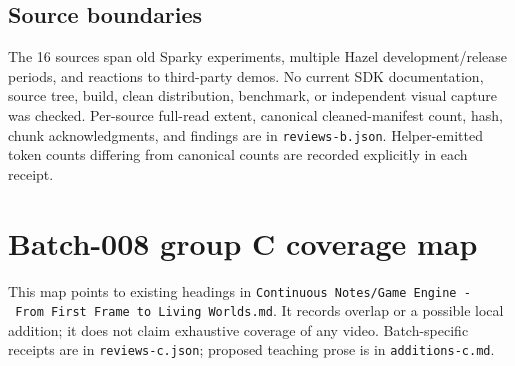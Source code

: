\subsection{Source boundaries}\label{appendix-877738f6f4d2-source-boundaries}

The 16 sources span old Sparky experiments, multiple Hazel development/release periods, and reactions to third-party demos. No current SDK documentation, source tree, build, clean distribution, benchmark, or independent visual capture was checked. Per-source full-read extent, canonical cleaned-manifest count, hash, chunk acknowledgments, and findings are in \texttt{reviews-b.json}. Helper-emitted token counts differing from canonical counts are recorded explicitly in each receipt.

\section{Batch-008 group C coverage map}\label{appendix-877738f6f4d2-batch-008-group-c-coverage-map}

This map points to existing headings in \texttt{Continuous\ Notes/Game\ Engine\ -\ From\ First\ Frame\ to\ Living\ Worlds.md}. It records overlap or a possible local addition; it does not claim exhaustive coverage of any video. Batch-specific receipts are in \texttt{reviews-c.json}; proposed teaching prose is in \texttt{additions-c.md}.

